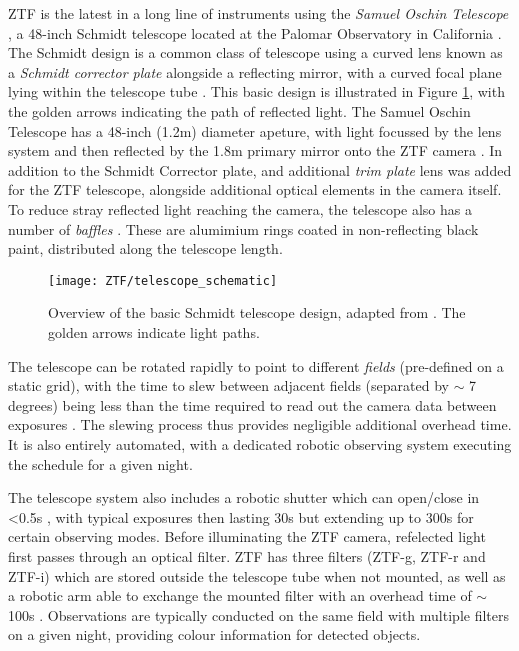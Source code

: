 ZTF is the latest in a long line of instruments using the \emph{Samuel Oschin Telescope} \cite{ztf_system}, a 48-inch Schmidt telescope located at the Palomar Observatory in California  . The Schmidt design is a common class of telescope using a curved lens known as a \emph{Schmidt corrector plate} alongside a reflecting mirror, with a curved focal plane lying within the telescope tube . This basic design is illustrated in Figure \ref{fig:ztf_schematic}, with the golden arrows indicating the path of reflected light. The Samuel Oschin Telescope has a 48-inch (1.2m) diameter apeture, with light focussed by the lens system and then reflected by the 1.8m primary mirror onto the ZTF camera . In addition to the Schmidt Corrector plate, and additional \emph{trim plate} lens was added for the ZTF telescope, alongside additional optical elements in the camera itself. To reduce stray reflected light reaching the camera, the telescope also has a number of \emph{baffles} \cite{ztf_obs_system}. These are alumimium rings coated in non-reflecting black paint, distributed along the telescope length.

\begin{figure}[!ht]
	\centering \texttt{[image: ZTF/telescope\_schematic]}
	\caption{Overview of the basic Schmidt telescope design, adapted from \cite{quest_07}. The golden arrows indicate light paths.}
	\label{fig:ztf_schematic}
\end{figure}

The telescope can be rotated rapidly to point to different \emph{fields} (pre-defined on a static grid), with the time to slew between adjacent fields (separated by $\sim$ 7 degrees) being less than the time required to read out the camera data between exposures \cite{ztf_system}. The slewing process thus provides negligible additional overhead time. It is also entirely automated, with a dedicated robotic observing system executing the schedule for a given night. 

The telescope system also includes a robotic shutter which can open/close in <0.5s \cite{ztf_system}, with typical exposures then lasting 30s but extending up to 300s for certain observing modes. Before illuminating the ZTF camera, refelected light first passes through an optical filter. ZTF has three filters (ZTF-g, ZTF-r and ZTF-i) which are stored outside the telescope tube when not mounted, as well as a robotic arm able to exchange the mounted filter with an overhead time of $\sim$100s \cite{ztf_system}. Observations are typically conducted on the same field with multiple filters on a given night, providing colour information for detected objects.

